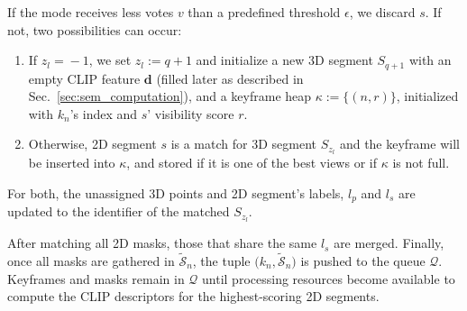 If the mode receives less votes \(v\) than a predefined threshold $\epsilon$, we discard $s$.
If not, two possibilities can occur:
\begin{enumerate}
    \item If $z_l\!=\!-1$, we set $z_l\!:=\!q\!+\!1$ and initialize a new 3D segment $S_{q+1}$ with an empty CLIP feature $\mathbf{d}$ (filled later as described in Sec.~\ref{sec:sem_computation}), and a keyframe heap $\kappa\!:=\!\{\left(n, r\right)\}$, initialized with $k_n$'s index and $s$' visibility score $r$.
    \item Otherwise, 2D segment $s$ is a match for 3D segment $S_{z_l}$ and the keyframe will be inserted into \(\kappa\), and stored if it is one of the best views or if \(\kappa\) is not full.
\end{enumerate}
%
For both, the unassigned 3D points and 2D segment's labels, $l_p$ and  $l_s$ are updated to the identifier of the matched ${S}_{z_l}$.

After matching all 2D masks, those that share the same $l_s$ are merged.
Finally, once all masks are gathered in $\tilde{\mathcal{S}}_n$, the tuple $\big(k_n,\tilde{\mathcal{S}}_n\big)$ is pushed to the queue \(\mathcal{Q}\).
Keyframes and masks remain in $\mathcal{Q}$ until processing resources become available to compute the CLIP descriptors for the highest-scoring 2D segments. 
%
%
